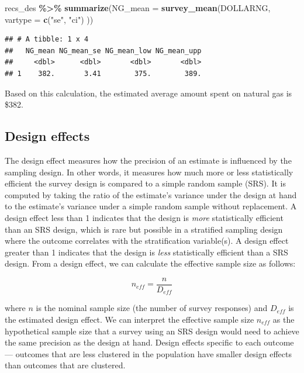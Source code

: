 \documentclass[
]{krantz}
\makeatletter
\newenvironment{Shaded}{\begin{snugshade}}{\end{snugshade}}
\newcommand{\AttributeTok}[1]{\textcolor[rgb]{0.27,0.27,0.27}{#1}}
\newcommand{\FunctionTok}[1]{\textcolor[rgb]{0.27,0.27,0.27}{\textbf{#1}}}
\newcommand{\NormalTok}[1]{#1}
\newcommand{\SpecialCharTok}[1]{\textcolor[rgb]{0.43,0.43,0.43}{\textbf{#1}}}
\newcommand{\StringTok}[1]{\textcolor[rgb]{0.5,0.5,0.5}{#1}}
\newenvironment{kframe}{%
\medskip{}
\setlength{\fboxsep}{.8em}
 \def\at@end@of@kframe{}%
 \ifinner\ifhmode%
  \def\at@end@of@kframe{\end{minipage}}%
  \begin{minipage}{\columnwidth}%
 \fi\fi%
 \def\FrameCommand##1{\hskip\@totalleftmargin \hskip-\fboxsep
 \colorbox{shadecolor}{##1}\hskip-\fboxsep
     \hskip-\linewidth \hskip-\@totalleftmargin \hskip\columnwidth}%
 \MakeFramed {\advance\hsize-\width
   \@totalleftmargin\z@ \linewidth\hsize
   \@setminipage}}%
 {\par\unskip\endMakeFramed%
 \at@end@of@kframe}
\renewenvironment{Shaded}{\begin{kframe}}{\end{kframe}}
\makeatother
\begin{document}
\begin{Shaded}
\begin{Highlighting}[]
\NormalTok{recs\_des }\SpecialCharTok{\%\textgreater{}\%}
  \FunctionTok{summarize}\NormalTok{(}\AttributeTok{NG\_mean =} \FunctionTok{survey\_mean}\NormalTok{(DOLLARNG,}
    \AttributeTok{vartype =} \FunctionTok{c}\NormalTok{(}\StringTok{"se"}\NormalTok{, }\StringTok{"ci"}\NormalTok{)}
\NormalTok{  ))}
\end{Highlighting}
\end{Shaded}

\begin{verbatim}
## # A tibble: 1 x 4
##   NG_mean NG_mean_se NG_mean_low NG_mean_upp
##     <dbl>      <dbl>       <dbl>       <dbl>
## 1    382.       3.41        375.        389.
\end{verbatim}

Based on this calculation, the estimated average amount spent on natural gas is \$382.

\hypertarget{desc-deff}{%
\subsection{Design effects}\label{desc-deff}}

The design effect measures how the precision of an estimate is influenced by the sampling design. In other words, it measures how much more or less statistically efficient the survey design is compared to a simple random sample (SRS). It is computed by taking the ratio of the estimate's variance under the design at hand to the estimate's variance under a simple random sample without replacement. A design effect less than 1 indicates that the design is \emph{more} statistically efficient than an SRS design, which is rare but possible in a stratified sampling design where the outcome correlates with the stratification variable(s). A design effect greater than 1 indicates that the design is \emph{less} statistically efficient than a SRS design. From a design effect, we can calculate the effective sample size as follows:

\[n_{eff}=\frac{n}{D_{eff}} \]

where \(n\) is the nominal sample size (the number of survey responses) and \(D_{eff}\) is the estimated design effect. We can interpret the effective sample size \(n_{eff}\) as the hypothetical sample size that a survey using an SRS design would need to achieve the same precision as the design at hand. Design effects specific to each outcome --- outcomes that are less clustered in the population have smaller design effects than outcomes that are clustered.
\end{document}
